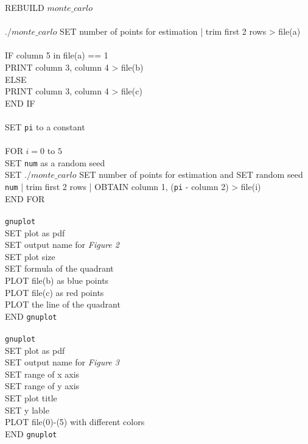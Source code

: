 \documentclass[12pt]{article}
\begin{document}
REBUILD $monte\_carlo$ \\
\\
./$monte\_carlo$ SET number of points for estimation | trim first 2 rows > file(a) \\
\\
IF column 5 in file(a) == 1 \\
\indent PRINT column 3, column 4 > file(b) \\
ELSE \\
\indent PRINT column 3, column 4 > file(c) \\
END IF \\
\\
SET \texttt{pi} to a constant\\
\\
FOR $i = 0$ to $5$ \\
\indent SET \texttt{num} as a random seed \\
\indent SET ./$monte\_carlo$ SET number of points for estimation and SET random seed \texttt{num} | trim first 2 rows | OBTAIN column 1, (\texttt{pi} - column 2) > file(i) \\
END FOR \\
\\
\texttt{gnuplot} \\
\indent SET plot as pdf \\
\indent SET output name for \textit{Figure 2} \\
\indent SET plot size \\
\indent SET formula of the quadrant \\
\indent PLOT file(b) as blue points \\
\indent PLOT file(c) as red points \\
\indent PLOT the line of the quadrant \\
END \texttt{gnuplot} \\
\\
\texttt{gnuplot} \\
\indent SET plot as pdf \\
\indent SET output name for \textit{Figure 3} \\
\indent SET range of x axis \\
\indent SET range of y axis \\
\indent SET plot title \\
\indent SET y lable \\
\indent PLOT file(0)-(5) with different colors \\
END \texttt{gnuplot} \\
\\
\end{document}
